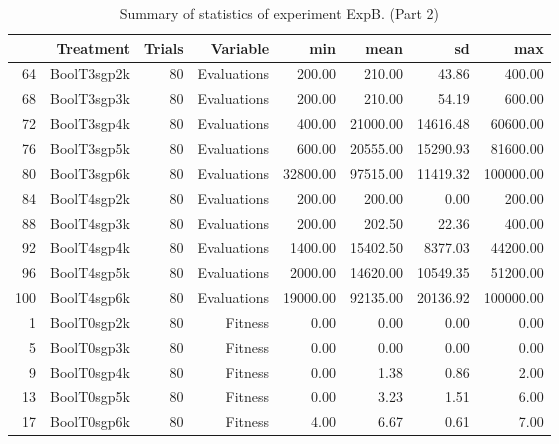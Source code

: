 \begin{table}[ht]
\centering
\begin{tabular}{rrrrrrrr}
  \hline
 & Treatment & Trials & Variable & min & mean & sd & max \\ 
  \hline
64 & BoolT3sgp2k &  80 & Evaluations & 200.00 & 210.00 & 43.86 & 400.00 \\ 
  68 & BoolT3sgp3k &  80 & Evaluations & 200.00 & 210.00 & 54.19 & 600.00 \\ 
  72 & BoolT3sgp4k &  80 & Evaluations & 400.00 & 21000.00 & 14616.48 & 60600.00 \\ 
  76 & BoolT3sgp5k &  80 & Evaluations & 600.00 & 20555.00 & 15290.93 & 81600.00 \\ 
  80 & BoolT3sgp6k &  80 & Evaluations & 32800.00 & 97515.00 & 11419.32 & 100000.00 \\ 
  84 & BoolT4sgp2k &  80 & Evaluations & 200.00 & 200.00 & 0.00 & 200.00 \\ 
  88 & BoolT4sgp3k &  80 & Evaluations & 200.00 & 202.50 & 22.36 & 400.00 \\ 
  92 & BoolT4sgp4k &  80 & Evaluations & 1400.00 & 15402.50 & 8377.03 & 44200.00 \\ 
  96 & BoolT4sgp5k &  80 & Evaluations & 2000.00 & 14620.00 & 10549.35 & 51200.00 \\ 
  100 & BoolT4sgp6k &  80 & Evaluations & 19000.00 & 92135.00 & 20136.92 & 100000.00 \\ 
  1 & BoolT0sgp2k &  80 & Fitness & 0.00 & 0.00 & 0.00 & 0.00 \\ 
  5 & BoolT0sgp3k &  80 & Fitness & 0.00 & 0.00 & 0.00 & 0.00 \\ 
  9 & BoolT0sgp4k &  80 & Fitness & 0.00 & 1.38 & 0.86 & 2.00 \\ 
  13 & BoolT0sgp5k &  80 & Fitness & 0.00 & 3.23 & 1.51 & 6.00 \\ 
  17 & BoolT0sgp6k &  80 & Fitness & 4.00 & 6.67 & 0.61 & 7.00 \\ 
   \hline
\end{tabular}
\caption{Summary of statistics of experiment ExpB. (Part 2)} 
\end{table}
